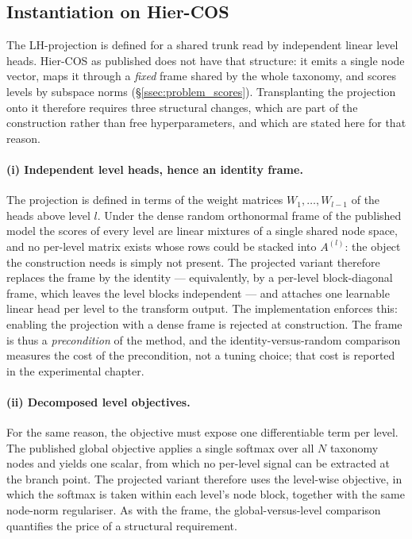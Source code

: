 \subsection{Instantiation on Hier-COS}
\label{ssec:lhproj_hiercos}

The LH-projection is defined for a shared trunk read by independent linear level
heads. Hier-COS as published does not have that structure: it emits a single node
vector, maps it through a \emph{fixed} frame shared by the whole taxonomy, and
scores levels by subspace norms (\S\ref{ssec:problem_scores}). Transplanting the
projection onto it therefore requires three structural changes, which are part of
the construction rather than free hyperparameters, and which are stated here for
that reason.

\paragraph{(i) Independent level heads, hence an identity frame.} The projection
is defined in terms of the weight matrices $W_1,\dots,W_{l-1}$ of the heads above
level $l$. Under the dense random orthonormal frame of the published model the
scores of every level are linear mixtures of a single shared node space, and no
per-level matrix exists whose rows could be stacked into $A^{(l)}$: the object the
construction needs is simply not present. The projected variant therefore replaces
the frame by the identity --- equivalently, by a per-level block-diagonal frame,
which leaves the level blocks independent --- and attaches one learnable linear
head per level to the transform output. The implementation enforces this: enabling
the projection with a dense frame is rejected at construction. The frame is thus a
\emph{precondition} of the method, and the identity-versus-random comparison
measures the cost of the precondition, not a tuning choice; that cost is reported
in the experimental chapter.

\paragraph{(ii) Decomposed level objectives.} For the same reason, the objective
must expose one differentiable term per level. The published global objective
applies a single softmax over all $N$ taxonomy nodes and yields one scalar, from
which no per-level signal can be extracted at the branch point. The projected
variant therefore uses the level-wise objective, in which the softmax is taken
within each level's node block, together with the same node-norm regulariser. As
with the frame, the global-versus-level comparison quantifies the price of a
structural requirement.

